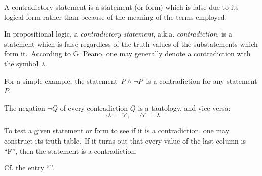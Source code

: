 \documentclass[12pt]{article}
\theoremstyle{definition}
\begin{document}
  

A contradictory statement is a statement (or form) which is false due to its logical form rather than because of the meaning of the terms employed.

In propositional logic, a {\em contradictory statement}, a.k.a. {\em contradiction}, is a statement which is false regardless of the truth values of the substatements which form it.\, According to G. Peano, one may generally denote a contradiction with the symbol $\curlywedge$.

For a simple example, the statement\, $P\!\wedge\!\lnot P$\, is a contradiction for any statement $P$.

The negation $\lnot Q$ of every contradiction $Q$ is a tautology, and vice versa:
 $$\lnot\curlywedge = \curlyvee, \;\;\; \lnot\curlyvee = \curlywedge$$

To test a given statement or form to see if it is a contradiction, one may construct its truth table.\, If it turns out that every value of the last column is ``F'', then the statement is a contradiction.

Cf. the entry ``''.
\end{document}
